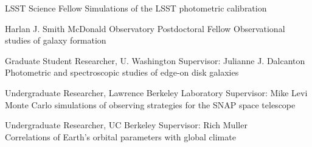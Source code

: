 
{\sc LSST Science Fellow}
Simulations of the LSST photometric calibration 

{\sc Harlan J. Smith McDonald Observatory Postdoctoral Fellow}
Observational studies of galaxy formation

{\sc Graduate Student Researcher, U. Washington}
Supervisor: Julianne J. Dalcanton \\
Photometric and spectroscopic studies of edge-on disk galaxies

{\sc Undergraduate Researcher, Lawrence Berkeley Laboratory}
Supervisor: Mike Levi \\
Monte Carlo simulations of observing strategies for the SNAP space telescope

{\sc Undergraduate Researcher, UC Berkeley}
Supervisor: Rich Muller\\
Correlations of Earth's orbital parameters with global climate
